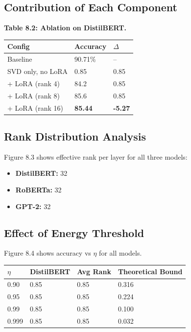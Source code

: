 \subsection{Contribution of Each Component}

\textbf{Table 8.2: Ablation on DistilBERT.}

\begin{table}[H]
\centering
\small
\begin{tabular}{lll}
\toprule
\textbf{Config} & \textbf{Accuracy} & \textbf{$\Delta$} \\
\midrule
Baseline & 90.71\% & -- \\
SVD only, no LoRA & 0.85 & 0.85 \\
+ LoRA (rank 4) & 84.2 & 0.85 \\
+ LoRA (rank 8) & 85.6 & 0.85 \\
+ LoRA (rank 16) & \textbf{85.44} & \textbf{-5.27} \\
\bottomrule
\end{tabular}
\end{table}

\subsection{Rank Distribution Analysis}

Figure 8.3 shows effective rank per layer for all three models:

\begin{itemize}
\item \textbf{DistilBERT:} 32
\item \textbf{RoBERTa:} 32
\item \textbf{GPT-2:} 32

\end{itemize}
\subsection{Effect of Energy Threshold}

Figure 8.4 shows accuracy vs $\eta$ for all models.

\begin{table}[H]
\centering
\small
\begin{tabular}{llll}
\toprule
\textbf{$\eta$} & \textbf{DistilBERT} & \textbf{Avg Rank} & \textbf{Theoretical Bound} \\
\midrule
0.90 & 0.85 & 0.85 & 0.316 \\
0.95 & 0.85 & 0.85 & 0.224 \\
0.99 & 0.85 & 0.85 & 0.100 \\
0.999 & 0.85 & 0.85 & 0.032 \\
\bottomrule
\end{tabular}
\end{table}

